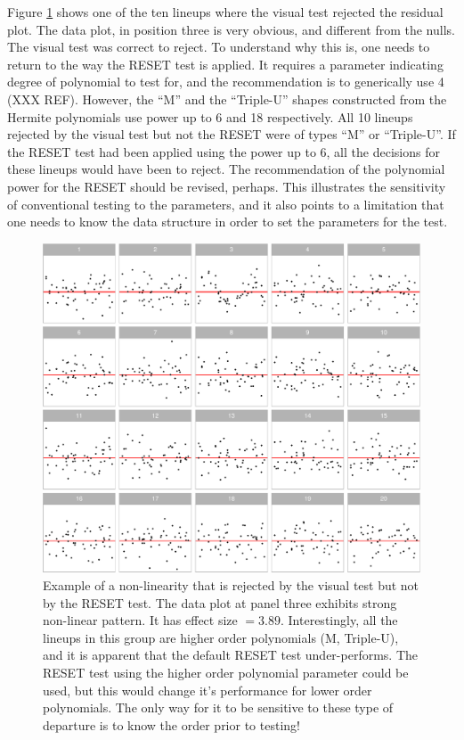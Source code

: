 \documentclass[]{interact}
\theoremstyle{plain}%
\theoremstyle{definition}
\theoremstyle{remark}
\begin{document}
Figure \ref{fig:poly-example} shows one of the ten lineups where the
visual test rejected the residual plot. The data plot, in position three
is very obvious, and different from the nulls. The visual test was
correct to reject. To understand why this is, one needs to return to the
way the RESET test is applied. It requires a parameter indicating degree
of polynomial to test for, and the recommendation is to generically use
4 (XXX REF). However, the ``M'' and the ``Triple-U'' shapes constructed
from the Hermite polynomials use power up to 6 and 18 respectively. All
10 lineups rejected by the visual test but not the RESET were of types
``M'' or ``Triple-U''. If the RESET test had been applied using the
power up to 6, all the decisions for these lineups would have been to
reject. The recommendation of the polynomial power for the RESET should
be revised, perhaps. This illustrates the sensitivity of conventional
testing to the parameters, and it also points to a limitation that one
needs to know the data structure in order to set the parameters for the
test.

\begin{figure}

{\centering \includegraphics[width=1\linewidth]{paper_comparison_files/figure-latex/poly-example-1} 

}

\caption{Example of a non-linearity that is rejected by the visual test but not by the RESET test. The data plot at panel three exhibits strong non-linear pattern. It has effect size $= 3.89$. Interestingly, all the lineups in this group are higher order polynomials (M, Triple-U), and it is apparent that the default RESET test under-performs. The RESET test using the higher order polynomial parameter could be used, but this would change it's performance for lower order polynomials. The only way for it to be sensitive to these type of departure is to know the order prior to testing!}\label{fig:poly-example}
\end{figure}
\end{document}
